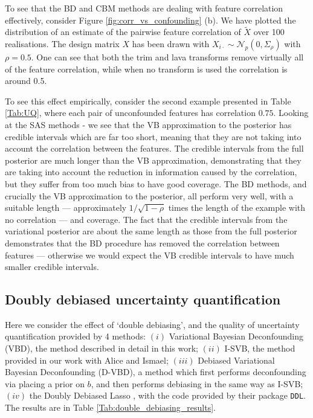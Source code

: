 \documentclass[11pt]{article}
\newcommand{\N}{\mathcal{N}}
\numberwithin{equation}{section}
\begin{document}
To see that the BD and CBM methods are dealing with feature correlation effectively, consider Figure \ref{fig:corr_vs_confounding} (b). We have plotted the distribution of an estimate of the pairwise feature correlation of $\tilde{X}$ over 100 realisations. The design matrix $X$ has been drawn with $X_{i\cdot} \sim \N_p(0, \Sigma_\rho)$ with $\rho = 0.5$. One can see that both the trim and lava transforms remove virtually all of the feature correlation, while when no transform is used the correlation is around 0.5.



To see this effect empirically, consider the second example presented in Table \ref{Tab:UQ}, where each pair of unconfounded features has correlation $0.75$. Looking at the SAS methods - we see that the VB approximation to the posterior has credible intervals which are far too short, meaning that they are not taking into account the correlation between the features. The credible intervals from the full posterior are much longer than the VB approximation, demonstrating that they are taking into account the reduction in information caused by the correlation, but they suffer from too much bias to have good coverage. The BD methods, and crucially the VB approximation to the posterior, all perform very well, with a suitable length --- approximately $1/\sqrt{1-\rho}$ times the length of the example with no correlation --- and coverage. The fact that the credible intervals from the variational posterior are about the same length as those from the full posterior demonstrates that the BD procedure has removed the correlation between features --- otherwise we would expect the VB credible intervals to have much smaller credible intervals.

\subsection{Doubly debiased uncertainty quantification}
Here we consider the effect of `double debiasing', and the quality of uncertainty quantification provided by 4 methods: $(i)$ Variational Bayesian Deconfounding (VBD), the method described in detail in this work; $(ii)$ I-SVB, the method provided in our work with Alice and Ismael; $(iii)$ Debiased Variational Bayesian Deconfounding (D-VBD), a method which first performs deconfounding via placing a prior on $b$, and then performs debiasing in the same way as I-SVB; $(iv)$ the Doubly Debiased Lasso \citep{GCB22}, with the code provided by their package \texttt{DDL}. The results are in Table \ref{Tab:double_debiasing_results}.
\end{document}
